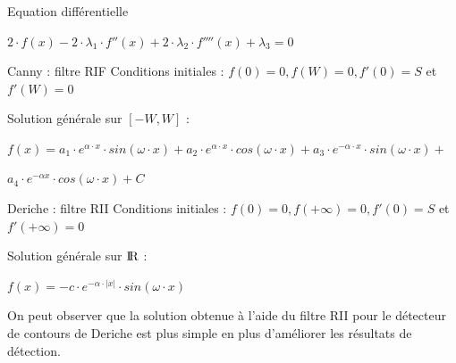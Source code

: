 \documentclass{beamer}
\begin{document}
\begin{frame}
\frametitle{}

\begin{block}{Equation différentielle}
\centerline {$ 2 \cdot f(x) - 2 \cdot \lambda_1 \cdot f''(x) + 2 \cdot \lambda_2 \cdot f''''(x) + \lambda_3 = 0$} 
\end{block}

\begin{block}{Canny : filtre RIF} 
Conditions initiales :
$ f(0)=0, f(W)=0, f'(0)=S$ et $f'(W)=0 $

Solution générale sur $ [-W,W] $ : \\

\centerline{$ f(x) = a_1 \cdot e^{\alpha \cdot x} \cdot sin(\omega \cdot x) + a_2 \cdot e^{\alpha \cdot x} \cdot cos(\omega \cdot x) + a_3 \cdot e^{-\alpha \cdot x} \cdot sin(\omega \cdot x) + $} 
\centerline{$ a_4 \cdot e^{-\alpha x} \cdot cos(\omega \cdot x) + C $} 
\end{block}

\begin{block}{Deriche : filtre RII} 
Conditions initiales : 
$ f(0)=0, f(+ \infty)=0, f'(0)=S$ et $f'(+ \infty)=0 $

Solution générale sur $ \rm I\!R $ : \\
\centerline{$f(x)= -c \cdot e^{-\alpha \cdot |x|} \cdot sin(\omega \cdot x)$}
\end{block}

On peut observer que la solution obtenue à l'aide du filtre RII pour le détecteur de contours de Deriche est plus simple en plus d'améliorer les résultats de détection.

\end{frame}
\end{document}
